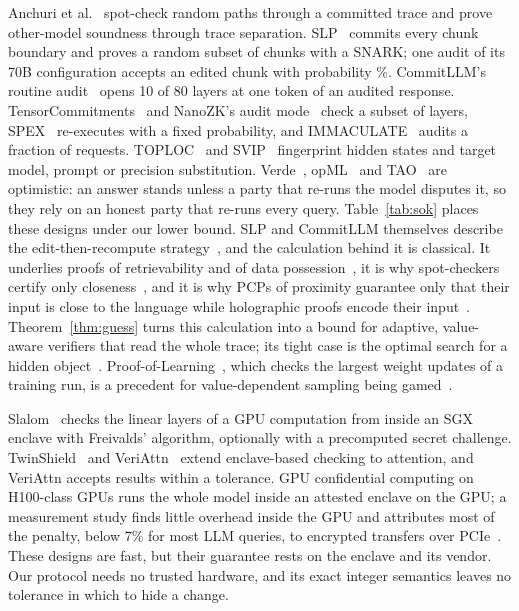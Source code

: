  Anchuri et al.~\cite{anchuri2026verifiable} spot-check random
paths through a committed trace and prove other-model soundness through trace separation.
SLP~\cite{slp} commits every chunk boundary and proves a random subset of chunks with a SNARK; one
audit of its 70B configuration accepts an edited chunk with probability \SokSlpAudit{}\%. CommitLLM's routine
audit~\cite{commitllm2026} opens 10 of 80 layers at one token of an audited response.
TensorCommitments~\cite{tensorcommitments} and NanoZK's audit mode~\cite{nanozk} check a subset of
layers, SPEX~\cite{spex} re-executes with a fixed probability, and IMMACULATE~\cite{immaculate}
audits a fraction of requests. TOPLOC~\cite{toploc} and SVIP~\cite{svip} fingerprint hidden states
and target model, prompt or precision substitution. Verde~\cite{verde}, opML~\cite{opml} and
TAO~\cite{tao} are optimistic: an answer stands unless a party that re-runs the model disputes it,
so they rely on an honest party that re-runs every query. Table~\ref{tab:sok} places these designs
under our lower bound. SLP and CommitLLM themselves describe the edit-then-recompute
strategy~\cite{slp,commitllm2026}, and the calculation behind it is classical. It underlies proofs
of retrievability and of data possession~\cite{juels2007por,ateniese2007pdp}, it is why
spot-checkers certify only closeness~\cite{ergun2000spotcheckers}, and it is why PCPs of proximity
guarantee only that their input is close to the language while holographic proofs encode their
input~\cite{bghsv2006robust,bfls1991,chiesa2020fractal}. Theorem~\ref{thm:guess} turns this
calculation into a bound for adaptive, value-aware verifiers that read the whole trace; its tight
case is the optimal search for a hidden object~\cite{chew1967,kadane1971}. Proof-of-Learning~\cite{jia2021pol},
which checks the largest weight updates of a training run, is a precedent for value-dependent
sampling being gamed~\cite{zhang2022pol,fang2023pol}.

 Slalom~\cite{slalom} checks the linear layers of a GPU computation from
inside an SGX enclave with Freivalds' algorithm, optionally with a precomputed secret challenge.
TwinShield~\cite{twinshield} and VeriAttn~\cite{veriattn} extend enclave-based checking to
attention, and VeriAttn accepts results within a tolerance. GPU confidential computing on
H100-class GPUs runs the whole model inside an attested enclave on the GPU; a measurement study
finds little overhead inside the GPU and attributes most of the penalty, below 7\% for most LLM
queries, to encrypted transfers over PCIe~\cite{gpucc}. These designs are fast, but their guarantee
rests on the enclave and its vendor. Our protocol needs no trusted hardware, and its exact integer
semantics leaves no tolerance in which to hide a change.

